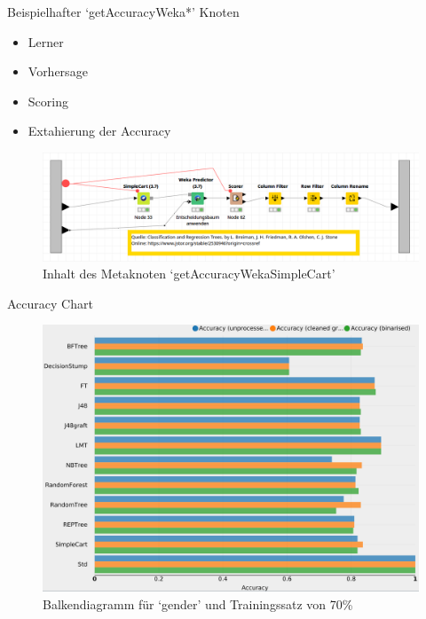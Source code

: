 \documentclass[
	handout,
  	aspectratio=169
]{beamer}
\begin{document}
			\begin{frame}{Beispielhafter `getAccuracyWeka*' Knoten}		
				\begin{itemize}
					\item Lerner	
					\item Vorhersage
					\item Scoring
					\item Extahierung der Accuracy
				\end{itemize}
				\begin{center}					
					\begin{figure}[h]
						\includegraphics[scale=0.25]{../pictures/trees-workflow-weka-example.png}
						\caption{Inhalt des Metaknoten `getAccuracyWekaSimpleCart'}		
					\end{figure}	
				\end{center}	
			\end{frame}
			
			\begin{frame}{Accuracy Chart}		
				\begin{center}					
					\begin{figure}[h]
						\includegraphics[scale=0.15]{../pictures/chart_accuracy.png}
						\caption{Balkendiagramm für `gender' und Trainingssatz von 70\%}		
					\end{figure}	
				\end{center}	
			\end{frame}
			
\end{document}
